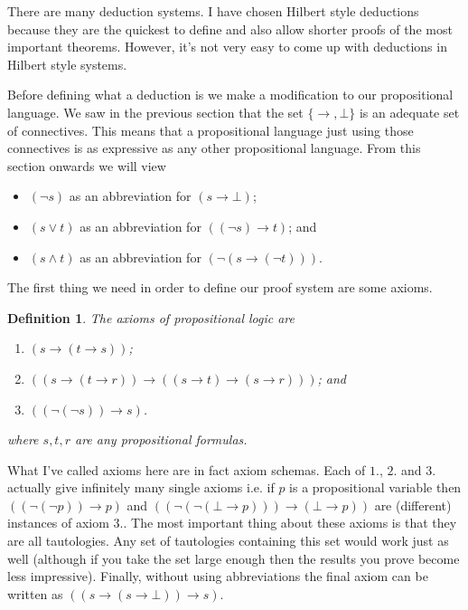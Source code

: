 \documentclass[11pt]{article}
\newtheorem{definition}[theorem]{Definition}
\begin{document}
There are many deduction systems. I have chosen Hilbert style deductions because they are the quickest to define and also allow shorter proofs of the most important theorems. However, it's not very easy to come up with deductions in Hilbert style systems.

Before defining what a deduction is we make a modification to our propositional language. We saw in the previous section that the set $\{\rightarrow, \bot\}$ is an adequate set of connectives. This means that a propositional language just using those connectives is as expressive as any other propositional language. From this section onwards we will view
\begin{itemize}
\item $(\neg s)$ as an abbreviation for $(s\rightarrow \bot)$;
\item $(s\vee t)$ as an abbreviation for $((\neg s)\rightarrow t)$; and
\item $(s\wedge t)$ as an abbreviation for $(\neg(s\rightarrow (\neg t)))$.
\end{itemize}

The first thing we need in order to define our proof system are some axioms.

\begin{definition}
The axioms of propositional logic are
\begin{enumerate}
\item $(s\rightarrow (t\rightarrow s))$;
\item $((s\rightarrow (t\rightarrow r))\rightarrow ((s\rightarrow t)\rightarrow (s\rightarrow r)))$; and
\item $((\neg(\neg s))\rightarrow s)$.
\end{enumerate}
where $s,t,r$ are any propositional formulas.
\end{definition}

What I've called axioms here are in fact axiom schemas. Each of $1.$, $2.$ and $3.$ actually give infinitely many single axioms i.e. if $p$ is a propositional variable then $((\neg(\neg p))\rightarrow p)$ and $((\neg(\neg (\bot\rightarrow p)))\rightarrow (\bot\rightarrow p))$ are (different) instances of axiom $3.$.
The most important thing about these axioms is that they are all tautologies. Any set of tautologies containing this set would work just as well (although if you take the set large enough then the results you prove become less impressive).
Finally, without using abbreviations the final axiom can be written as $((s\rightarrow (s\rightarrow \bot))\rightarrow s)$.
\end{document}
